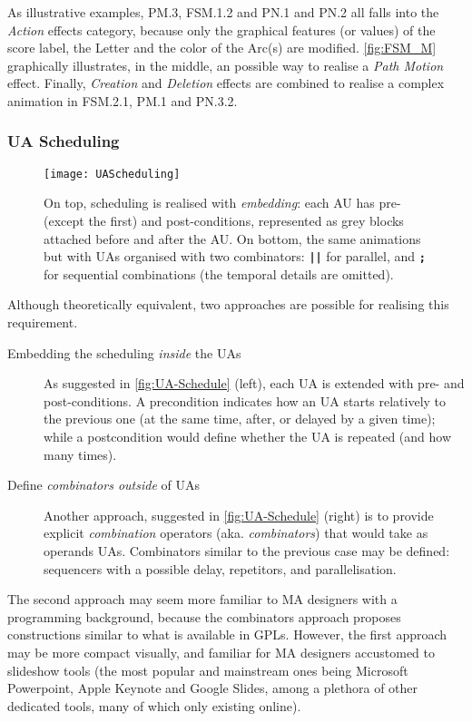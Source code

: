 As illustrative examples, \textsf{PM.3}, \textsf{FSM.1.2} and \textsf{PN.1} and \textsf{PN.2}
all falls into the \emph{Action} effects category, because only the graphical 
features (or values) of the score label, the \textsf{Letter} and the color of the
\textsf{Arc}(s) are modified. \autoref{fig:FSM_M} graphically illustrates,
in the middle, an possible way to realise a \emph{Path Motion} effect. Finally,
\emph{Creation} and \emph{Deletion} effects are combined to realise a complex 
animation in \textsf{FSM.2.1}, \textsf{PM.1} and \textsf{PN.3.2}. 

\subsubsection{UA Scheduling}
\label{sec:MA-Scheduling}

\begin{figure}[t]%
   \centering
   \texttt{[image: UAScheduling]}%
   \caption{On top, scheduling is realised with \emph{embedding}: each AU has 
   pre- (except the first) and post-conditions, represented as grey blocks attached 
   before and after the AU. On bottom, the same animations but with UAs organised with
   two combinators: \texttt{\textbf{||}} for parallel, and \texttt{\textbf{;}} for
   sequential combinations (the temporal details are omitted).
   }%
   \label{fig:UA-Schedule}%
\end{figure}

Although theoretically equivalent, two approaches are possible for realising
this requirement.
\begin{description}
   \item[Embedding the scheduling \emph{inside} the UAs] As suggested in 
   \autoref{fig:UA-Schedule} (left), each UA is extended with pre- and 
   post-conditions. A precondition indicates how an UA starts relatively to the 
   previous one (at the same time, after, or delayed by a given time); while a
   postcondition would define whether the UA is repeated (and how many times).
   
   \item[Define \emph{combinators outside} of UAs] Another approach, suggested
   in \autoref{fig:UA-Schedule} (right) is to provide explicit \emph{combination}
   operators (aka. \emph{combinators}) that would take as operands UAs. Combinators
   similar to the previous case may be defined: sequencers with a possible delay,
   repetitors, and parallelisation. 
\end{description}
The second approach may seem more familiar to MA designers with a programming 
background, because the combinators approach proposes constructions similar to
what is available in GPLs. However, the first approach may be more compact visually,
and familiar for MA designers accustomed to slideshow tools (the most popular and
mainstream ones being Microsoft Powerpoint, Apple Keynote and Google Slides, among
a plethora of other dedicated tools, many of which only existing online).


